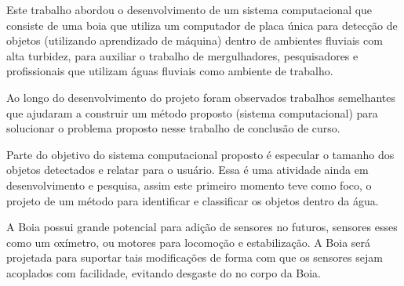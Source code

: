 \label{chapter:consideracoes}

Este trabalho abordou o desenvolvimento de um sistema computacional que consiste de uma boia que utiliza um computador de placa única para detecção de objetos (utilizando aprendizado de máquina) dentro de ambientes fluviais com alta turbidez, para auxiliar o trabalho de mergulhadores, pesquisadores e profissionais que utilizam águas fluviais como ambiente de trabalho.

Ao longo do desenvolvimento do projeto foram observados trabalhos semelhantes que ajudaram a construir um método proposto (sistema computacional) para solucionar o problema proposto nesse trabalho de conclusão de curso.

Parte do objetivo do sistema computacional proposto é especular o tamanho dos objetos detectados e relatar para o usuário. Essa é uma atividade ainda em desenvolvimento e pesquisa, assim este primeiro momento teve como foco, o projeto de um método para identificar e classificar os objetos dentro da água.

A Boia possui grande potencial para adição de sensores no futuros, sensores esses como um oxímetro, ou motores para locomoção e estabilização. A Boia será projetada para suportar tais modificações de forma com que os sensores sejam acoplados com facilidade, evitando desgaste do no corpo da Boia.